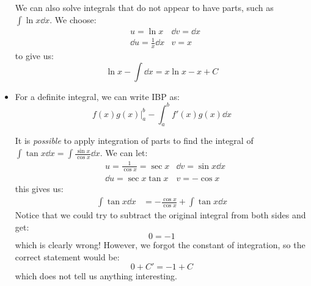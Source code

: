 \begin{itemize}
\begin{example}
        We can also solve integrals that do not appear to have parts, such as $\int \ln x \dd{x}$. We choose:
        \begin{align}
            &u=\ln x            &\dd{v} =\dd{x} \\ 
            &\dd{u}=\frac{1}{x}\dd{x} &v=x
        \end{align}
        to give us:
        \begin{equation}
            \ln x - \int \dd{x} = x\ln x - x + C
        \end{equation}
    \end{example}
    \item For a definite integral, we can write IBP as:
    \begin{equation}
        f(x)g(x)\Big|^b_a-\int_a^b f'(x)g(x) \dd{x}
    \end{equation}
    \begin{example}
        It is \textit{possible} to apply integration of parts to find the integral of $\int \tan x \dd{x} = \int \frac{\sin x}{\cos x} \dd{x}$. We can let:
        \begin{align}
            &u=\frac{1}{\cos x}=\sec x            &\dd{v} =\sin x\dd{x} \\ 
            &\dd{u}=\sec x\tan x &v=-\cos x
        \end{align}
        this gives us:
        \begin{align}
            \int \tan x \dd{x} &= -\frac{\cos x}{\cos x}+ \int \tan x \dd{x}
        \end{align}
        Notice that we could try to subtract the original integral from both sides and get:
        \begin{equation}
            0 = -1
        \end{equation}
        which is clearly wrong! However, we forgot the constant of integration, so the correct statement would be:
        \begin{equation}
            0 + C' = -1 + C
        \end{equation}
        which does not tell us anything interesting.
    \end{example}
\end{itemize}
